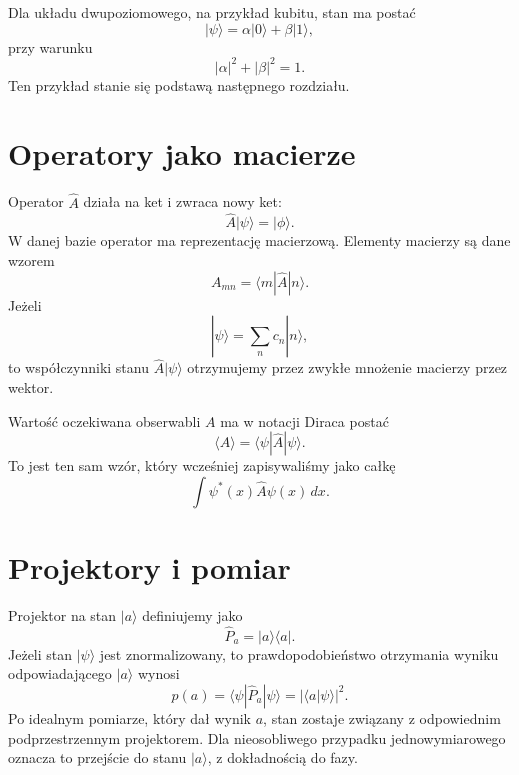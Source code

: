 Dla układu dwupoziomowego, na przykład kubitu, stan ma postać
\begin{equation}
    |\psi\rangle=\alpha|0\rangle+\beta|1\rangle,
\end{equation}
przy warunku
\begin{equation}
    |\alpha|^2+|\beta|^2=1.
\end{equation}
Ten przykład stanie się podstawą następnego rozdziału.

\section{Operatory jako macierze}

Operator \(\hat{A}\) działa na ket i zwraca nowy ket:
\begin{equation}
    \hat{A}|\psi\rangle=|\phi\rangle.
\end{equation}
W danej bazie operator ma reprezentację macierzową. Elementy macierzy są dane wzorem
\begin{equation}
    A_{mn}=\langle m|\hat{A}|n\rangle.
\end{equation}
Jeżeli
\begin{equation}
    |\psi\rangle=\sum_n c_n|n\rangle,
\end{equation}
to współczynniki stanu \(\hat{A}|\psi\rangle\) otrzymujemy przez zwykłe mnożenie macierzy przez wektor.

Wartość oczekiwana obserwabli \(A\) ma w notacji Diraca postać
\begin{equation}
    \langle\hat{A}\rangle=\langle\psi|\hat{A}|\psi\rangle.
\end{equation}
To jest ten sam wzór, który wcześniej zapisywaliśmy jako całkę
\begin{equation}
    \int \psi^*(x)\hat{A}\psi(x)\,dx.
\end{equation}

\section{Projektory i pomiar}

Projektor na stan \(|a\rangle\) definiujemy jako
\begin{equation}
    \hat{P}_a=|a\rangle\langle a|.
\end{equation}
Jeżeli stan \(|\psi\rangle\) jest znormalizowany, to prawdopodobieństwo otrzymania wyniku odpowiadającego \(|a\rangle\) wynosi
\begin{equation}
    p(a)=\langle\psi|\hat{P}_a|\psi\rangle=|\langle a|\psi\rangle|^2.
\end{equation}
Po idealnym pomiarze, który dał wynik \(a\), stan zostaje związany z odpowiednim podprzestrzennym projektorem. Dla nieosobliwego przypadku jednowymiarowego oznacza to przejście do stanu \(|a\rangle\), z dokładnością do fazy.

